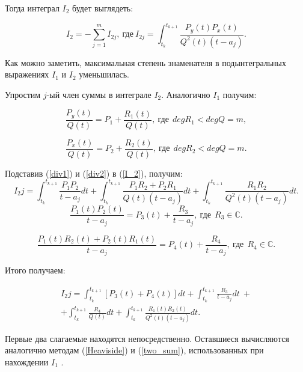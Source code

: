 \documentclass{article}
\begin{document}
Тогда интеграл $I_2$ будет выглядеть:

\begin{equation} \label{I_2}
	I_2 =  - \sum_{j=1}^{m} I_{2j} ,\  \text{где} \ I_{2j} = \int_{t_{k}}^{t_{k+1}} \frac{P_y(t) P_x(t)}{Q^2(t) (t - a_j)}.
\end{equation}

Как можно заметить, максимальная степень знаменателя в подынтегральных выражениях $I_1$ и $I_2$ уменьшилась.

Упростим $j$-ый член суммы в интеграле $I_2$. Аналогично $I_1$ получим:

\begin{equation} \label{div1}
	\frac{P_y(t)}{Q(t)} = P_1 + \frac{R_1(t)}{Q(t)}, \ \text{где} \ \ degR_1 < degQ=m,
\end{equation}

\begin{equation} \label{div2}
	\frac{P_x(t)}{Q(t)} = P_2 + \frac{R_2(t)}{Q(t)}, \ \text{где} \ \ degR_2 < degQ=m.
\end{equation}

Подставив (\ref{div1}) и (\ref{div2}) в (\ref{I_2}), получим:
\begin{equation} \label{I_2j}
	I_2j = \int_{t_{k}}^{t_{k+1}} \frac{P_1P_2}{t-a_j} dt + 
		  \int_{t_{k}}^{t_{k+1}} \frac{P_1 R_2 + P_2 R_1}{Q(t)(t-a_j)} dt + 
		  \int_{t_{k}}^{t_{k+1}} \frac{R_1R_2}{Q^2(t)(t-a_j)} dt.
\end{equation}
\begin{equation} \label{div3}
	\frac{P_1(t)P_2(t)}{t-a_j} = P_3(t) + \frac{R_3}{t-a_j}, \ \text{где} \ \ R_3 \in  \mathbb{C}.
\end{equation}

\begin{equation} \label{div4}
	\frac{P_1(t) R_2(t) + P_2(t) R_1(t)}{t-a_j} = P_4(t) + \frac{R_4}{t-a_j}, \ \text{где} \ \ R_4 \in  \mathbb{C}.
\end{equation}

Итого получаем:

\begin{multline}
	I_2j = \int_{t_{k}}^{t_{k+1}} \left[P_3(t) + P_4(t)\right] dt +
	\int_{t_{k}}^{t_{k+1}} \frac{R_3}{t-a_j} dt  \ + \\
	+ \int_{t_{k}}^{t_{k+1}} \frac{R_4}{Q(t)} dt + 
	\int_{t_{k}}^{t_{k+1}} \frac{R_1(t)R_2(t)}{Q^2(t)(t-a_j)} dt.
\end{multline}

Первые два слагаемые находятся непосредственно. Оставшиеся вычисляются аналогично методам (\ref{Heaviside}) и (\ref{two_sum}), использованных при нахождении $I_1$ .
\end{document}
